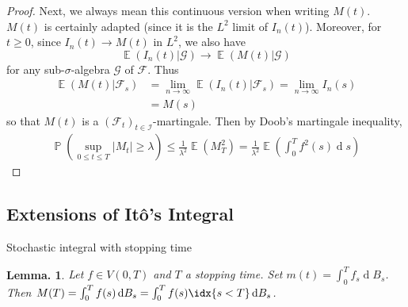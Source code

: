 \documentclass[11pt, a4paper]{memoir}
\theoremstyle{change}
\newtheorem{lemma}[theorem]{Lemma.}
\theoremstyle{plain}
\theoremstyle{nonumberplain}
\newtheorem{proof}{Proof}
\DeclareMathOperator{\pr}{{\mathbb{P}}}
\DeclareMathOperator{\E}{{\mathbb{E}}}
\renewcommand{\d}[1]{\ensuremath{\operatorname{d}\!{#1}}}
\numberwithin{equation}{section}
\begin{document}
\begin{proof}
    Next, we always mean this continuous version when writing $M(t)$.
    $M(t)$ is certainly adapted (since it is the $L^2$ limit of $I_n(t)$).
    Moreover, for $t\geq 0$, since $I_n(t)\to M(t)$ in $L^2$, we also have
    \begin{equation*}
        \E(I_n(t)|\mathcal{G})\to \E(M(t)|\mathcal{G})
    \end{equation*}
    for any sub-$\sigma$-algebra $\mathcal{G}$ of $\mathcal{F}$.
    Thus
    \begin{align*}
        \E(M(t)|\mathcal{F}_s)&= \lim_{n\to\infty}\E(I_n(t)|\mathcal{F}_s)=\lim_{n\to\infty}I_n(s)\\
                              &= M(s)
    \end{align*}
    so that $M(t)$ is a $(\mathcal{F}_t)_{t\in \mathcal{I}}$-martingale.
    Then by Doob's martingale inequality,
    \begin{align*}
        \pr(\sup_{0\leq t\leq T}|M_t|\geq\lambda)\leq\frac{1}{\lambda^2}\E(M_T^2)=\frac{1}{\lambda^2}\E(\int_0^Tf^2(s)\d{s})
    \end{align*}
\end{proof}
\subsection{Extensions of Itô's Integral}
Stochastic integral with stopping time
\begin{lemma}
    Let $f\in V(0,T)$ and $T$ a stopping time.
    Set $m(t)=\int_0^Tf_s\d{B_s}$.
    Then $M(T)=\int_0^Tf(s)\d{B_s}=\int_0^Tf(s)\idx{s<T}\d{B_s}$.
\end{lemma}
\end{document}
